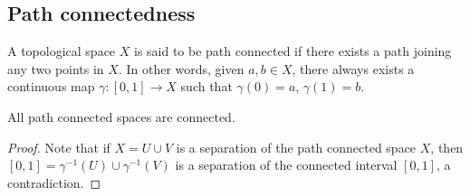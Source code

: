 \documentclass[11pt]{article}
\theoremstyle{definition}
\theoremstyle{remark}
\numberwithin{equation}{section}
\begin{document}
    \subsection{Path connectedness}

    \begin{definition}
        A topological space $X$ is said to be path connected if there exists a path
        joining any two points in $X$. In other words, given $a, b \in X$, there
        always exists a continuous map $\gamma\colon [0, 1] \to X$ such that
        $\gamma(0) = a$, $\gamma(1) = b$.
    \end{definition}

    \begin{lemma}
        All path connected spaces are connected.
    \end{lemma}
    \begin{proof}
        Note that if $X = U \cup V$ is a separation of the path connected space $X$,
        then $[0, 1] = \gamma^{-1}(U) \cup \gamma^{-1}(V)$ is a separation of the
        connected interval $[0, 1]$, a contradiction.
    \end{proof}
\end{document}
